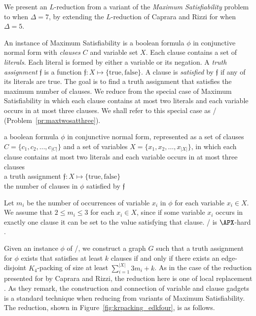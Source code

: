 We present an $L$-reduction from a variant of the \emph{Maximum Satisfiability} problem to \edkfour when $\Delta=7$, by extending the $L$-reduction of Caprara and Rizzi \cite{caprara_packing_2002} for \edkthree when $\Delta=5$.

An instance of Maximum Satisfiability is a boolean formula $\phi$ in conjunctive normal form with \emph{clauses} $C$ and variable set $X$. Each clause contains a set of \emph{literals}. Each literal is formed by either a variable or its negation. A \emph{truth assignment} $\mathfrak{f}$ is a function $\mathfrak{f} : X \mapsto \{ \text{true}, \text{false} \}$. A clause is \emph{satisfied} by $\mathfrak{f}$ if any of its literals are true. The goal is to find a truth assignment that satisfies the maximum number of clauses. We reduce from the special case of Maximum Satisfiability in which each clause contains at most two literals and each variable occurs in at most three clauses. We shall refer to this special case as \maxtwosatthree/ (Problem~\ref{pr:maxtwosatthree}).

\begin{myproblem}[\maxtwosatthree/]
\label{pr:maxtwosatthree}
\begin{samepage}
\begin{adjustwidth}{8pt}{8pt}
\instance a boolean formula $\phi$ in conjunctive normal form, represented as a set of clauses $C = \{ c_1, c_2, \dots, c_{|C|} \}$ and a set of variables $X = \{ x_1, x_2, \dots, x_{|X|} \}$, in which each clause contains at most two literals and each variable occurs in at most three clauses\\
\solution a truth assignment $\mathfrak{f} : X \mapsto \{ \text{true}, \text{false} \}$\\
\measure the number of clauses in $\phi$ satisfied by $\mathfrak{f}$
\end{adjustwidth}
\end{samepage}
\end{myproblem}

Let $m_i$ be the number of occurrences of variable $x_i$ in $\phi$ for each variable $x_i \in X$. We assume that $2\leq m_i \leq 3$ for each $x_i \in X$, since if some variable $x_i$ occurs in exactly one clause it can be set to the value satisfying that clause. \maxtwosatthree/ is $\APX$-hard \cite{ACGKMP99}.

Given an instance $\phi$ of \maxtwosatthree/, we construct a graph $G$ such that a truth assignment for $\phi$ exists that satisfies at least $k$ clauses if and only if there exists an edge-disjoint $K_4$-packing of size at least $\sum_{i=1}^{|X|} 3 m_i + k$. As in the case of the reduction presented for \edkthree by Caprara and Rizzi, the reduction here is one of local replacement \cite{GJ79}. As they remark, the construction and connection of variable and clause gadgets is a standard technique when reducing from variants of Maximum Satisfiability. The reduction, shown in Figure~\ref{fig:krpacking_edkfour}, is as follows.

